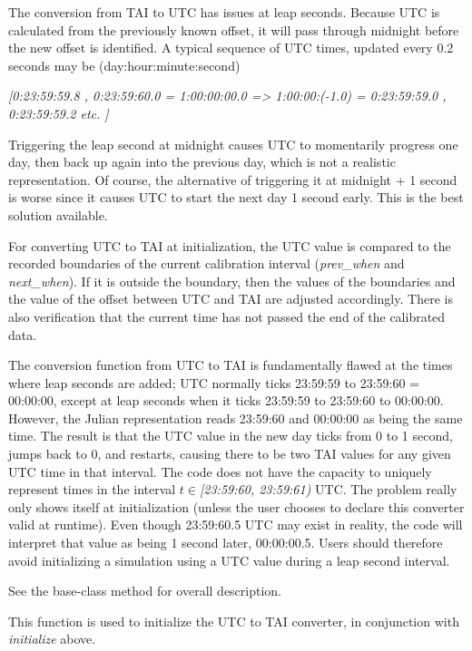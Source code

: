 {\begin{enumerate}
{\begin{enumerate}
The conversion from TAI to UTC has issues at leap seconds.
Because UTC is calculated from the previously known offset, it will
pass through midnight before the new offset is identified.  A typical
sequence of UTC times, updated every 0.2 seconds may be
(day:hour:minute:second)

{\itshape
[0:23:59:59.8 ,  0:23:59:60.0 = 1:00:00:00.0 ={\textgreater}
1:00:00:(-1.0) = 0:23:59:59.0 , 0:23:59:59.2 etc. ] }

Triggering the leap second at midnight causes UTC to momentarily progress one
day, then back up again into the
previous day, which is not a realistic representation.  Of course, the
alternative of triggering it at midnight + 1 second is worse since it
causes UTC to start the next day 1 second early.  This is the best
solution available.

For converting UTC to TAI at initialization, the UTC value is
compared to the recorded boundaries of the current calibration interval
(\textit{prev\_when} and \textit{next\_when}).  If it is outside the
boundary, then the values of the boundaries and the value of the offset
between UTC and TAI are adjusted accordingly.  There
is also verification that the current time has not passed the end of
the calibrated data.

The conversion function from UTC to TAI is
fundamentally flawed at the times where leap seconds are added;
UTC normally ticks 23:59:59 to 23:59:60 = 00:00:00, except at
leap seconds when it ticks 23:59:59 to 23:59:60 to 00:00:00.  However,
the Julian representation reads 23:59:60 and 00:00:00 as being the same
time.  The result is that the UTC value in the new day ticks
from 0 to 1 second, jumps back to 0, and restarts, causing there to be
two TAI values for any given UTC time in that
interval.  The code does not have the capacity to uniquely represent times
in the interval  $t\in $\textit{[23:59:60, 23:59:61)} UTC.
The problem really only shows itself at initialization (unless the user
chooses to declare this converter valid at runtime).
Even though 23:59:60.5  UTC may exist in reality,
the code will interpret that value as being 1 second later, 00:00:00.5.
 Users should therefore avoid initializing a simulation using a
UTC value during a leap second interval.


See the base-class  method
for overall description.

\label{ref:initializeleapseconds}
This function is used to initialize the UTC to TAI converter, in
conjunction with \textit{initialize} above.


\end{enumerate}}
\end{enumerate}}
